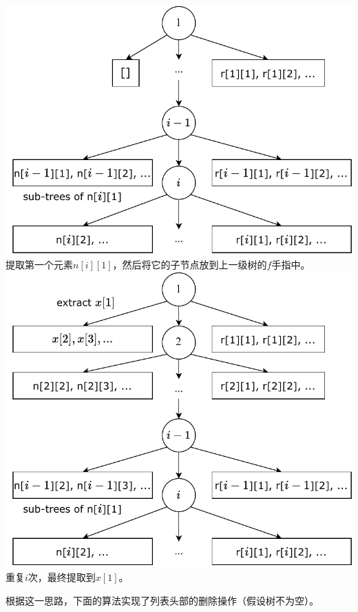 \documentclass[b5paper]{ctexart}
\begin{document}
\begin{Answer}[ref = {ex:finger-tree-del}]
{\begin{center}
  \includegraphics[scale=0.4]{img/ftr-illed-2} \\
  提取第一个元素$n[i][1]$，然后将它的子节点放到上一级树的$f$手指中。\\
  \includegraphics[scale=0.4]{img/ftr-illed-i} \\
  重复$i$次，最终提取到$x[1]$。\\
  \label{fig:ftr-illed-extract}
\end{center}

根据这一思路，下面的算法实现了列表头部的删除操作（假设树不为空）。

}
\end{Answer}
\end{document}
